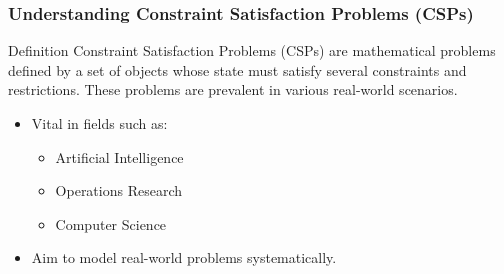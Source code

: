 \documentclass[aspectratio=169]{beamer}
\begin{document}
\begin{frame}[fragile]
    \frametitle{Understanding Constraint Satisfaction Problems (CSPs)}
    \begin{block}{Definition}
        Constraint Satisfaction Problems (CSPs) are mathematical problems defined by a set of objects whose state must satisfy several constraints and restrictions. These problems are prevalent in various real-world scenarios.
    \end{block}
    \begin{itemize}
        \item Vital in fields such as:
        \begin{itemize}
            \item Artificial Intelligence
            \item Operations Research
            \item Computer Science
        \end{itemize}
        \item Aim to model real-world problems systematically.
    \end{itemize}
\end{frame}
\end{document}
